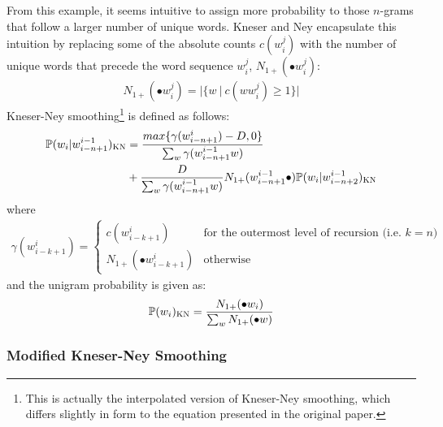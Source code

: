 \documentclass[a4paper, 12pt]{report}
\begin{document}
From this example, it seems intuitive to assign more probability to those $n$-grams that follow a larger number of unique words. Kneser and Ney encapsulate this intuition by replacing some of the absolute counts $c(w_i^j)$ with the number of unique words that precede the word sequence $w_i^j$, $N_{1+}(\bullet w_i^j)$:
\begin{gather}
	N_{1+}(\bullet w_i^j) = |\{w\ |\ c(ww_i^j) \geq 1\}|
\end{gather}
Kneser-Ney smoothing\footnote{This is actually the interpolated version of Kneser-Ney smoothing, which differs slightly in form to the equation presented in the original paper.} is defined as follows:
\begin{align}
	\mathbb{P}(w_i | w_{i - n + 1}^{i - 1})_{\text{\scshape KN}} &= \frac{max\{\gamma(w_{i - n + 1}^{i}) - D, 0\}}{\sum_w \gamma(w_{i - n + 1}^{i - 1}w)} \\
	&+ \frac{D}{\sum_w \gamma(w_{i - n + 1}^{i - 1}w)}N_{1+}(w_{i - n + 1}^{i - 1}\bullet)\mathbb{P}(w_i | w_{i - n + 2}^{i - 1})_{\text{\scshape KN}}
\end{align}
where
\begin{gather} \label{eq:gamma}
	\gamma(w_{i - k + 1}^i) = \begin{cases}
		c(w_{i - k + 1}^i) &\text{for the outermost level of recursion (i.e. $k = n$)} \\
		N_{1+}(\bullet w_{i - k + 1}^i) &\text{otherwise}
	\end{cases}
\end{gather}
and the unigram probability is given as:
\begin{gather}
	\mathbb{P}(w_i)_{\text{\scshape KN}} = \frac{N_{1+}(\bullet w_i)}{\sum_w N_{1+}(\bullet w)}
\end{gather}

\subsubsection{Modified Kneser-Ney Smoothing}
\end{document}
